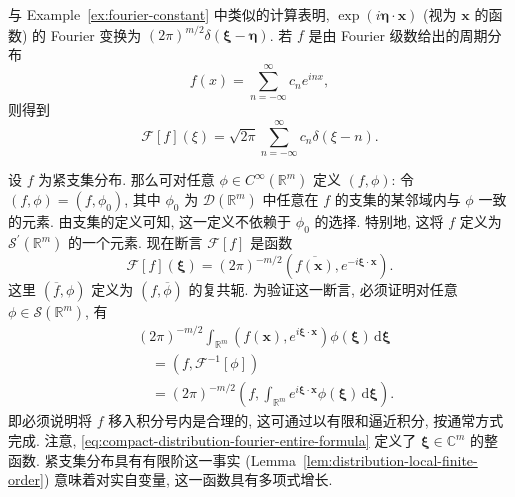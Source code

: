 \begin{Example}
\label{ex:fourier-exponential-periodic}
与 Example~\ref{ex:fourier-constant} 中类似的计算表明, $\exp(i\bm{\eta}\cdot\bm{x})$ (视为 $\bm{x}$ 的函数) 的 Fourier 变换为 $(2\pi)^{m/2}\delta(\bm{\xi}-\bm{\eta})$. 若 $f$ 是由 Fourier 级数给出的周期分布
\begin{equation}\label{eq:periodic-distribution-fourier-series}
f(x)=\sum_{n=-\infty}^{\infty}c_ne^{inx},
\end{equation}
则得到
\begin{equation}\label{eq:periodic-distribution-fourier-point-masses}
\mathcal{F}[f](\xi)=\sqrt{2\pi}\sum_{n=-\infty}^{\infty}c_n\delta(\xi-n).
\end{equation}

\end{Example}

\begin{Example}
\label{ex:fourier-compact-distribution-entire}
设 $f$ 为紧支集分布. 那么可对任意 $\phi\in C^\infty(\mathbb{R}^m)$ 定义 $(f,\phi)$: 令 $(f,\phi)=(f,\phi_0)$, 其中 $\phi_0$ 为 $\mathcal{D}(\mathbb{R}^m)$ 中任意在 $f$ 的支集的某邻域内与 $\phi$ 一致的元素. 由支集的定义可知, 这一定义不依赖于 $\phi_0$ 的选择. 特别地, 这将 $f$ 定义为 $\mathcal{S}^{\prime}(\mathbb{R}^m)$ 的一个元素. 现在断言 $\mathcal{F}[f]$ 是函数
\begin{equation}\label{eq:compact-distribution-fourier-entire-formula}
\mathcal{F}[f](\bm{\xi})=(2\pi)^{-m/2}(\overline{f(\bm{x})},e^{-i\bm{\xi}\cdot\bm{x}}).
\end{equation}
这里 $(\overline f,\phi)$ 定义为 $(f,\overline\phi)$ 的复共轭. 为验证这一断言, 必须证明对任意 $\phi\in\mathcal{S}(\mathbb{R}^m)$, 有
\begin{equation}\label{eq:compact-distribution-fourier-integral-interchange}
\begin{aligned}
&(2\pi)^{-m/2}\int_{\mathbb{R}^m}(f(\bm{x}),e^{i\bm{\xi}\cdot\bm{x}})\phi(\bm{\xi})\,\mathrm{d}\bm{\xi}\\
&\quad=(f,\mathcal{F}^{-1}[\phi])\\
&\quad=(2\pi)^{-m/2}\left(f,\int_{\mathbb{R}^m}e^{i\bm{\xi}\cdot\bm{x}}\phi(\bm{\xi})\,\mathrm{d}\bm{\xi}\right).
\end{aligned}
\end{equation}
即必须说明将 $f$ 移入积分号内是合理的, 这可通过以有限和逼近积分, 按通常方式完成. 注意, \eqref{eq:compact-distribution-fourier-entire-formula} 定义了 $\bm{\xi}\in\mathbb{C}^m$ 的整函数. 紧支集分布具有有限阶这一事实 (Lemma~\ref{lem:distribution-local-finite-order}) 意味着对实自变量, 这一函数具有多项式增长.
\end{Example}
